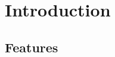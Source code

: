 \documentclass{article}
\begin{document}
\section{Introduction}
\subsection{Features}
\end{document}
